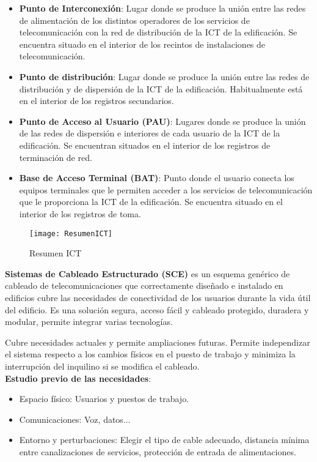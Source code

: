 \documentclass[10pt,portrait, twocolumn]{article}
\begin{document}
	\begin{itemize}
		\item \textbf{Punto de Interconexión}: Lugar donde se produce la unión entre las redes de alimentación de los distintos operadores de los servicios de telecomunicación con la red de distribución de la ICT de la edificación. Se encuentra situado en el interior de los recintos de instalaciones de telecomunicación.
		\item \textbf{Punto de distribución}: Lugar donde se produce la unión entre las redes de distribución y de dispersión de la ICT de la edificación. Habitualmente está en el interior de los registros secundarios.
		\item \textbf{Punto de Acceso al Usuario (PAU)}: Lugares donde se produce la unión de las redes de dispersión e interiores de cada usuario de la ICT de la edificación. Se encuentran situados en el interior de los registros de terminación de red.
		\item \textbf{Base de Acceso Terminal (BAT)}: Punto donde el usuario conecta los equipos terminales que le permiten acceder a los servicios de telecomunicación que le proporciona la ICT de la edificación. Se encuentra situado en el interior de los registros de toma.
	\end{itemize}
	
\begin{figure}[h]
	\centering
     \texttt{[image: ResumenICT]}
      \caption{Resumen ICT}
      \label{fig:ONT}
  \end{figure}

\textbf{Sistemas de  Cableado Estructurado (SCE)} es un esquema genérico de cableado de telecomunicaciones que correctamente diseñado e instalado en edificios cubre las necesidades de conectividad de los usuarios durante la vida útil del edificio. Es una solución segura, acceso fácil y cableado protegido, duradera y modular, permite integrar varias tecnologías.

\quad Cubre necesidades actuales y permite ampliaciones futuras. Permite independizar el sistema respecto a los cambios físicos en el puesto de trabajo y minimiza la interrupción del inquilino si se modifica el cableado.\\

\textbf{Estudio previo de las necesidades}:

	\begin{itemize}
	\item Espacio físico: Usuarios y puestos de trabajo. 
	\item Comunicaciones: Voz, datos...
	\item Entorno y perturbaciones: Elegir el tipo de cable adecuado, distancia mínima entre canalizaciones de servicios, protección de entrada de alimentaciones.
	\end{itemize}
\end{document}
